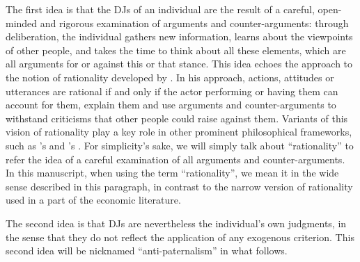 \documentclass[version=3.21, pagesize, twoside=off, bibliography=totoc, DIV=calc, fontsize=12pt, a4paper, french, english]{scrartcl}
\begin{document}
The first idea is that the \acp{DJ} of an individual are the result of a careful, open-minded and rigorous examination of arguments and counter-arguments: through deliberation, the individual gathers new information, learns about the viewpoints of other people, and takes the time to think about all these elements, 
which are all arguments for or against this or that stance. 
This idea echoes the approach to the notion of rationality developed by \citet{habermas_theorie_1981}.
In his approach, actions, attitudes or utterances are rational if and only if the actor performing or having them can account for them, explain them and use arguments and counter-arguments to withstand criticisms that other people could raise against them. 
Variants of this vision of rationality play a key role in other prominent philosophical frameworks, such as \citeauthor{scanlon_what_2000}’s \citeyearpar{scanlon_what_2000} and \citeauthor{sen_idea_2009}’s \citeyearpar{sen_idea_2009}. 
For simplicity’s sake, we will simply talk about “rationality” to refer the idea of a careful examination of all arguments and counter-arguments.
In this manuscript, when using the term “rationality”, we mean it in the wide sense described in this paragraph, in contrast to the narrow version of rationality used in a part of the economic literature.

The second idea is that \acp{DJ} are nevertheless the individual’s own judgments, in the sense that they do not reflect the application of any exogenous criterion. 
This second idea will be nicknamed “anti-paternalism” in what follows.

\end{document}
